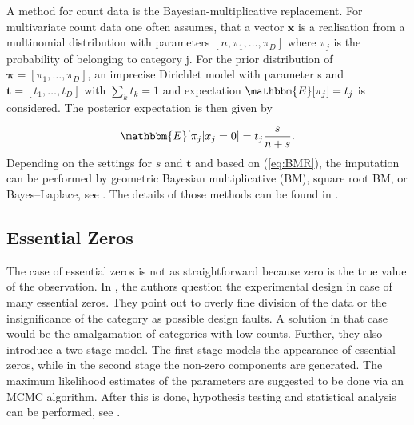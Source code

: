 A method for count data is the Bayesian-multiplicative replacement. For multivariate count data one often assumes, that a vector $\bm{x}$ is a realisation from a multinomial distribution with parameters $[n,\pi_1,\ldots,\pi_D]$ where $\pi_j$ is the probability of belonging to category j. For the prior distribution of $\bm{\pi}=[\pi_1,\ldots,\pi_D]$, an imprecise Dirichlet model with parameter s and $\bm{t}=[t_1,\ldots,t_D]$ with $\sum_k t_k=1$ and expectation $\mathbbm{E}[\pi_j]=t_j$ is considered. The posterior expectation is then given by 


\begin{equation}
\mathbbm{E}[\pi_j|x_j=0]=t_j \frac{s}{n+s}.
\label{eq:BMR}
\end{equation}
%
Depending on the settings for $s$ and $\bm{t}$ and based on (\ref{eq:BMR}), the imputation can be performed by geometric Bayesian multiplicative (BM), square root BM, or Bayes–Laplace, see \textcite{Palarea-Albaladejo:2015}. The details of those methods can be found in \textcite{Fernandez:2015}. 


\subsection{Essential Zeros}
\label{sec: Essential Zeros}

The case of essential zeros is not as straightforward because zero is the true value of the observation. In \textcite{Aitchison:2003}, the authors question the experimental design in case of many essential zeros. They point out to overly fine division of the data or the insignificance of the category as possible design faults. A solution in that case would be the amalgamation of categories with low counts. Further, they also introduce a two stage model. The first stage models the appearance of essential zeros, while in the second stage the non-zero components are generated. The maximum likelihood estimates of the parameters are suggested to be done via an MCMC algorithm. After this is done, hypothesis testing and statistical analysis can be performed, see \textcite{Aitchison:2003}. 

